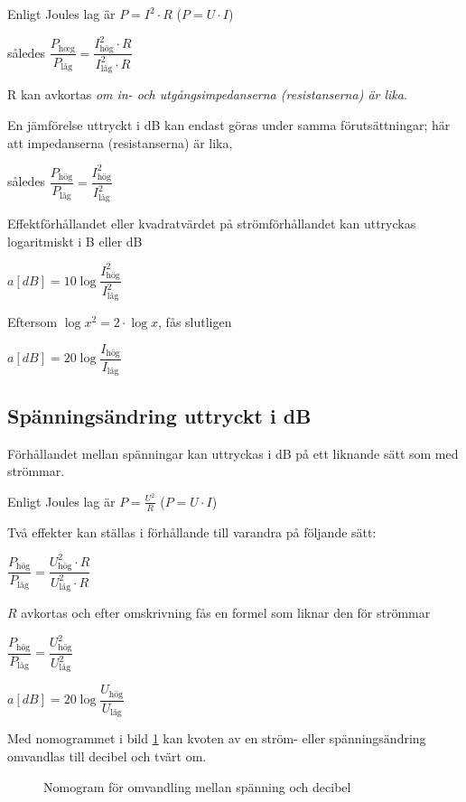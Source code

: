 Enligt Joules lag är \(P = I^2 \cdot R\) (\(P = U \cdot I\))

således \(\dfrac{P_\text{h{\oe}g}}{P_\text{l{\aa}g}} = \dfrac{I_\text{hög}^2 \cdot R}{I_\text{l{\aa}g}^2 \cdot R}\)

R kan avkortas \emph{om in- och utgångsimpedanserna (resistanserna) är lika}.

En jämförelse uttryckt i dB kan endast göras under samma förutsättningar;
här att impedanserna (resistanserna) är lika,

således \(\dfrac{P_\text{hög}}{P_\text{låg}} = \dfrac{I_\text{hög}^2}{I_\text{låg}^2}\)

Effektförhållandet eller kvadratvärdet på strömförhållandet kan uttryckas
logaritmiskt i B eller dB

\(a[dB] = 10\log \dfrac{I_\text{hög}^2}{I_\text{låg}^2}\)

Eftersom \(\log x^2 = 2 \cdot \log x\), fås slutligen

\(a[dB] = 20\log \dfrac{I_\text{hög}}{I_\text{låg}}\)

\subsection{Spänningsändring uttryckt i dB}

Förhållandet mellan spänningar kan uttryckas i dB på ett liknande sätt som med
strömmar.

Enligt Joules lag är \(P = \frac{U^2}{R}\) (\(P = U \cdot I\))

Två effekter kan ställas i förhållande till varandra på följande sätt:

\(\dfrac{P_\text{hög}}{P_\text{låg}}=\dfrac{U_\text{hög}^2 \cdot R}{U_\text{låg}^2 \cdot R}\)

\(R\) avkortas och efter omskrivning fås en formel som liknar den för strömmar

\(\dfrac{P_\text{hög}}{P_\text{låg}} = \dfrac{U_\text{hög}^2}{U_\text{låg}^2}\)

\(a[dB] = 20\log \dfrac{U_\text{hög}}{U_\text{låg}}\)

Med nomogrammet i bild \ref{ellära-nomogram-db-spänning} kan kvoten av en
ström- eller spänningsändring omvandlas till decibel och tvärt om.

\begin{figure}
  \caption{Nomogram för omvandling mellan spänning och decibel}
  \label{ellära-nomogram-db-spänning}
\end{figure}

